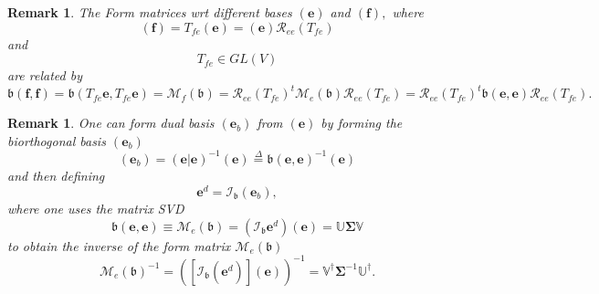 \documentclass[aps,preprint]{revtex4}%
\newtheorem{remark}[theorem]{Remark}
\begin{document}
\begin{remark}
The Form matrices wrt different bases $\left(  \boldsymbol{e}\right)  $ and
$\left(  \boldsymbol{f}\right)  ,$ where
\begin{equation}
\left(  \boldsymbol{f}\right)  =T_{fe}\left(  \boldsymbol{e}\right)  =\left(
\boldsymbol{e}\right)  \mathcal{R}_{ee}\left(  T_{fe}\right)
\end{equation}
and
\begin{equation}
T_{fe}\in GL\left(  V\right)
\end{equation}
are related by
\begin{equation}
\mathfrak{b}\left(  \boldsymbol{f},\boldsymbol{f}\right)  =\mathfrak{b}\left(
T_{fe}\boldsymbol{e},T_{fe}\boldsymbol{e}\right)  =\mathcal{M}_{f}\left(
\mathfrak{b}\right)  =\mathcal{R}_{ee}\left(  T_{fe}\right)  ^{t}%
\mathcal{M}_{e}\left(  \mathfrak{b}\right)  \mathcal{R}_{ee}\left(
T_{fe}\right)  =\mathcal{R}_{ee}\left(  T_{fe}\right)  ^{t}\mathfrak{b}\left(
\boldsymbol{e},\boldsymbol{e}\right)  \mathcal{R}_{ee}\left(  T_{fe}\right)  .
\end{equation}

\end{remark}

\begin{remark}
One can form dual basis $\left(  \mathbf{e}_{b}\right)  $ from $\left(
\boldsymbol{e}\right)  $ by forming the biorthogonal basis $\left(
\mathbf{e}_{b}\right)  $
\begin{equation}
\left(  \mathbf{e}_{b}\right)  =\left(  \left.  \boldsymbol{e}\right\vert
\boldsymbol{e}\right)  ^{-1}\left(  \boldsymbol{e}\right)  \overset{\Delta
}{=}\mathfrak{b}\left(  \boldsymbol{e},\boldsymbol{e}\right)  ^{-1}\left(
\boldsymbol{e}\right)
\end{equation}
and then defining
\begin{equation}
\boldsymbol{e}^{d}=\mathcal{I}_{\mathfrak{b}}\left(  \mathbf{e}_{b}\right)  ,
\end{equation}
where one uses the matrix SVD \label{matrix SVD}
\begin{equation}
\mathfrak{b}\left(  \boldsymbol{e},\boldsymbol{e}\right)  \equiv
\mathcal{M}_{e}\left(  \mathfrak{b}\right)  =\left(  \mathcal{I}%
_{\mathfrak{b}}\boldsymbol{e}^{d}\right)  \left(  \boldsymbol{e}\right)
=\mathbb{U}\boldsymbol{\Sigma}\mathbb{V}%
\end{equation}
to obtain the inverse of the form matrix $\mathcal{M}_{e}\left(
\mathfrak{b}\right)  $
\begin{equation}
\mathcal{M}_{e}\left(  \mathfrak{b}\right)  ^{-1}=\left(  \left[
\mathcal{I}_{\mathfrak{b}}\left(  \overset{}{\boldsymbol{e}^{d}}\right)
\right]  \left(  \overset{}{\boldsymbol{e}}\right)  \right)  ^{-1}%
=\mathbb{V}^{\dagger}\boldsymbol{\Sigma}^{-1}\mathbb{U}^{\dagger}.
\end{equation}

\end{remark}
\end{document}

